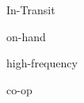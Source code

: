 \documentclass[11pt,a4paper]{article}
\begin{document}
In-Transit

on-hand

high-frequency

co-op
\end{document}
